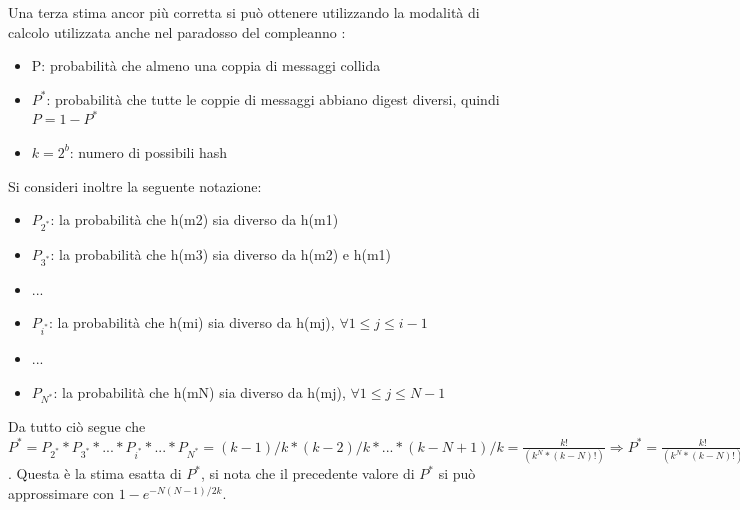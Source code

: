 Una terza stima ancor più corretta si può ottenere utilizzando la modalità di calcolo utilizzata anche nel paradosso del compleanno :
\begin{itemize}
\item P: probabilità che almeno una coppia di messaggi collida
\item $P^{*}$: probabilità che tutte le coppie di messaggi abbiano digest diversi, quindi $P = 1 - P^{*}$
\item $k = 2^{b}$: numero di possibili hash
\end{itemize}
Si consideri inoltre la seguente notazione:
\begin{itemize}
\item $P_{2^{*}}$: la probabilità che h(m2) sia diverso da h(m1)
\item $P_{3^{*}}$: la probabilità che h(m3) sia diverso da h(m2) e h(m1)
\item ...
\item $P_{i^{*}}$: la probabilità che h(mi) sia diverso da h(mj), $\forall 1\leq j \leq i-1$
\item ...
\item $P_{N^{*}}$: la probabilità che h(mN) sia diverso da h(mj), $\forall 1\leq j \leq N-1$
\end{itemize}
Da tutto ciò segue che $P^{*}=P_{2^{*}}*P_{3^{*}}*...*P_{i^{*}}*...*P_{N^{*}}=
(k - 1)/k*(k - 2)/k*...*(k - N + 1)/k = \frac{k!}{(k^{N}*(k - N)!)}\Rightarrow P^{*} = \frac{k!}{(k^{N}*(k - N)!)}$.
Questa è la stima esatta di $P^{*}$, si nota che il precedente valore di $P^{*}$ si può approssimare con $1 - e^{- N(N - 1)/2k}$.

